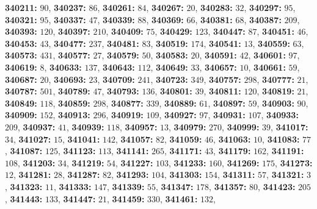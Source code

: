 \textsf{\bfseries 340211:} $90$, \textsf{\bfseries 340237:} $86$, \textsf{\bfseries 340261:} $84$, \textsf{\bfseries 340267:} $20$, \textsf{\bfseries 340283:} $32$, \textsf{\bfseries 340297:} $95$, \textsf{\bfseries 340321:} $95$, \textsf{\bfseries 340337:} $47$, \textsf{\bfseries 340339:} $88$, \textsf{\bfseries 340369:} $66$, \textsf{\bfseries 340381:} $68$, \textsf{\bfseries 340387:} $209$, \textsf{\bfseries 340393:} $120$, \textsf{\bfseries 340397:} $210$, \textsf{\bfseries 340409:} $75$, \textsf{\bfseries 340429:} $123$, \textsf{\bfseries 340447:} $87$, \textsf{\bfseries 340451:} $46$, \textsf{\bfseries 340453:} $43$, \textsf{\bfseries 340477:} $237$, \textsf{\bfseries 340481:} $83$, \textsf{\bfseries 340519:} $174$, \textsf{\bfseries 340541:} $13$, \textsf{\bfseries 340559:} $63$, \textsf{\bfseries 340573:} $431$, \textsf{\bfseries 340577:} $27$, \textsf{\bfseries 340579:} $50$, \textsf{\bfseries 340583:} $20$, \textsf{\bfseries 340591:} $42$, \textsf{\bfseries 340601:} $97$, \textsf{\bfseries 340619:} $8$, \textsf{\bfseries 340633:} $137$, \textsf{\bfseries 340643:} $112$, \textsf{\bfseries 340649:} $33$, \textsf{\bfseries 340657:} $10$, \textsf{\bfseries 340661:} $59$, \textsf{\bfseries 340687:} $20$, \textsf{\bfseries 340693:} $23$, \textsf{\bfseries 340709:} $241$, \textsf{\bfseries 340723:} $349$, \textsf{\bfseries 340757:} $298$, \textsf{\bfseries 340777:} $21$, \textsf{\bfseries 340787:} $501$, \textsf{\bfseries 340789:} $47$, \textsf{\bfseries 340793:} $136$, \textsf{\bfseries 340801:} $39$, \textsf{\bfseries 340811:} $120$, \textsf{\bfseries 340819:} $21$, \textsf{\bfseries 340849:} $118$, \textsf{\bfseries 340859:} $298$, \textsf{\bfseries 340877:} $339$, \textsf{\bfseries 340889:} $61$, \textsf{\bfseries 340897:} $59$, \textsf{\bfseries 340903:} $90$, \textsf{\bfseries 340909:} $152$, \textsf{\bfseries 340913:} $296$, \textsf{\bfseries 340919:} $109$, \textsf{\bfseries 340927:} $97$, \textsf{\bfseries 340931:} $107$, \textsf{\bfseries 340933:} $209$, \textsf{\bfseries 340937:} $41$, \textsf{\bfseries 340939:} $118$, \textsf{\bfseries 340957:} $13$, \textsf{\bfseries 340979:} $270$, \textsf{\bfseries 340999:} $39$, \textsf{\bfseries 341017:} $34$, \textsf{\bfseries 341027:} $15$, \textsf{\bfseries 341041:} $142$, \textsf{\bfseries 341057:} $82$, \textsf{\bfseries 341059:} $46$, \textsf{\bfseries 341063:} $10$, \textsf{\bfseries 341083:} $77$, \textsf{\bfseries 341087:} $125$, \textsf{\bfseries 341123:} $113$, \textsf{\bfseries 341141:} $265$, \textsf{\bfseries 341171:} $43$, \textsf{\bfseries 341179:} $162$, \textsf{\bfseries 341191:} $108$, \textsf{\bfseries 341203:} $34$, \textsf{\bfseries 341219:} $54$, \textsf{\bfseries 341227:} $103$, \textsf{\bfseries 341233:} $160$, \textsf{\bfseries 341269:} $175$, \textsf{\bfseries 341273:} $12$, \textsf{\bfseries 341281:} $28$, \textsf{\bfseries 341287:} $82$, \textsf{\bfseries 341293:} $104$, \textsf{\bfseries 341303:} $154$, \textsf{\bfseries 341311:} $57$, \textsf{\bfseries 341321:} $3$, \textsf{\bfseries 341323:} $11$, \textsf{\bfseries 341333:} $147$, \textsf{\bfseries 341339:} $55$, \textsf{\bfseries 341347:} $178$, \textsf{\bfseries 341357:} $80$, \textsf{\bfseries 341423:} $205$, \textsf{\bfseries 341443:} $133$, \textsf{\bfseries 341447:} $21$, \textsf{\bfseries 341459:} $330$, \textsf{\bfseries 341461:} $132$, 
